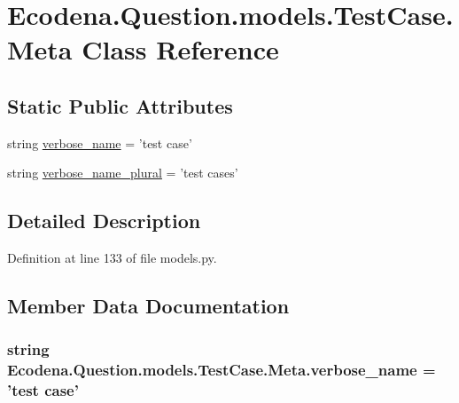 \hypertarget{class_ecodena_1_1_question_1_1models_1_1_test_case_1_1_meta}{
\section{Ecodena.Question.models.TestCase.Meta Class Reference}
\label{d7/de8/class_ecodena_1_1_question_1_1models_1_1_test_case_1_1_meta}
}
\subsection*{Static Public Attributes}
\begin{DoxyCompactItemize}
\item 
string \hyperlink{class_ecodena_1_1_question_1_1models_1_1_test_case_1_1_meta_abf0e677fcc13a01c9d414e3f49366397}{verbose\_\-name} = 'test case'
\item 
string \hyperlink{class_ecodena_1_1_question_1_1models_1_1_test_case_1_1_meta_a5d437326b1d427e4225daeb42b308535}{verbose\_\-name\_\-plural} = 'test cases'
\end{DoxyCompactItemize}


\subsection{Detailed Description}


Definition at line 133 of file models.py.



\subsection{Member Data Documentation}
\hypertarget{class_ecodena_1_1_question_1_1models_1_1_test_case_1_1_meta_abf0e677fcc13a01c9d414e3f49366397}{
\subsubsection[{verbose\_\-name}]{\setlength{\rightskip}{0pt plus 5cm}string {\bf Ecodena.Question.models.TestCase.Meta.verbose\_\-name} = 'test case'}}
\label{d7/de8/class_ecodena_1_1_question_1_1models_1_1_test_case_1_1_meta_abf0e677fcc13a01c9d414e3f49366397}


